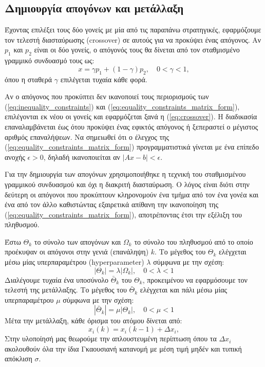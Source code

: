 \documentclass[a4paper,12pt]{article}
\begin{document}
\subsection{Δημιουργία απογόνων και μετάλλαξη}
Έχοντας επιλέξει τους δύο γονείς με μία από τις παραπάνω στρατηγικές, εφαρμόζουμε τον τελεστή διασταύρωσης
(crossover) σε αυτούς για να προκύψει ένας απόγονος. 
Αν $p_1$ και $p_2$ είναι οι δύο γονείς, ο απόγονός τους θα δίνεται από τον σταθμισμένο γραμμικό συνδυασμό τους ως:
\begin{equation}
    x = \gamma p_1 +(1 - \gamma) p_2, \quad 0 < \gamma < 1,
    \label{eq:crossover}
\end{equation}
όπου η σταθερά $\gamma$ επιλέγεται τυχαία κάθε φορά. 

Αν ο απόγονος που προκύπτει δεν ικανοποιεί τους περιορισμούς
των (\ref{eq:inequality_constraints}) και (\ref{eq:equality_constraints_matrix_form}), επιλέγονται εκ νέου οι γονείς
και εφαρμόζεται ξανά η (\ref{eq:crossover}). Η διαδικασία επαναλαμβάνεται έως ότου προκύψει ένας εφικτός απόγονος ή
ξεπεραστεί ο μέγιστος αριθμός επαναλήψεων. Να σημειωθεί ότι ο έλεγχος της (\ref{eq:equality_constraints_matrix_form})
προγραμματιστικά γίνεται με ένα επίπεδο ανοχής $\epsilon > 0$, δηλαδή ικανοποιείται αν $|Ax - b| < \epsilon$.

Για την δημιουργία των απογόνων χρησιμοποιήθηκε η τεχνική του σταθμισμένου γραμμικού συνδυασμού και όχι η διακριτή
διασταύρωση. Ο λόγος είναι διότι στην δεύτερη οι απόγονοι που προκύπτουν κληρονομούν ένα τμήμα από τον ένα γονέα
και ένα από τον άλλο καθιστώντας εξαιρετικά απίθανη την ικανοποίηση της (\ref{eq:equality_constraints_matrix_form}),
αποτρέποντας έτσι την εξέλιξη του πληθυσμού.

Έστω $\Theta_k$ το σύνολο των απογόνων και $\Omega_k$ το σύνολο του πληθυσμού από το οποίο προέκυψαν οι απόγονοι
στην γενιά (επανάληψη) $k$. Το μέγεθος του $\Theta_k$ ελέγχεται μέσω μίας υπερπαραμέτρου 
(hyperparameter) $\lambda$ σύμφωνα με την σχέση:
\begin{equation}
    |\Theta_k| = \lambda |\Omega_k|, \quad 0 < \lambda < 1
    \label{eq:population_offspring_size}
\end{equation}
Διαλέγουμε τυχαία ένα υποσύνολο $\bar{\Theta}_k$ του $\Theta_k$, 
προκειμένου να εφαρμόσουμε τον τελεστή της μετάλλαξης. Το μέγεθος του $\bar{\Theta}_k$ ελέγχεται και πάλι μέσω μίας
υπερπαραμέτρου $\mu$ σύμφωνα με την σχέση:
\begin{equation}
    |\bar{\Theta}_k| = \mu |\Theta_k|, \quad 0 < \mu < 1
    \label{eq:offspring_mutation_size}
\end{equation}
Μέτα την μετάλλαξη, κάθε όρισμα του ατόμου δίνεται από:
\begin{equation}
    x_i(k) = x_i(k-1) + \Delta x_i,
    \label{eq:mutation}
\end{equation}
Στην υλοποίησή μας θεωρούμε την απλουστευμένη περίπτωση όπου τα $\Delta x_i$ ακολουθούν όλα την ίδια Γκαουσιανή 
κατανομή με μέση τιμή μηδέν και τυπική απόκλιση $\sigma$. 
\end{document}
